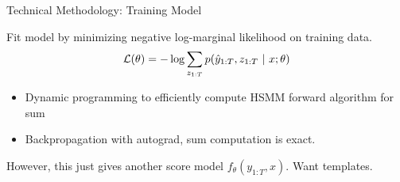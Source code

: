 \begin{frame}{Technical Methodology:  Training Model}


  Fit model by minimizing  negative log-marginal likelihood on training data.
    \[ {\cal L}(\theta) =  - \log \sum_{z_{1:T}} p(\hat{y}_{1:T}, z_{1:T} \ |\ x; \theta)\]
    \air
  
    \begin{itemize}
    \item Dynamic programming to efficiently compute HSMM forward algorithm for sum
    \item Backpropagation with autograd, sum computation is exact.
    \end{itemize}

    However, this just gives another score model $f_\theta(y_{1:T}, x)$. Want templates.
    \air
\end{frame}


